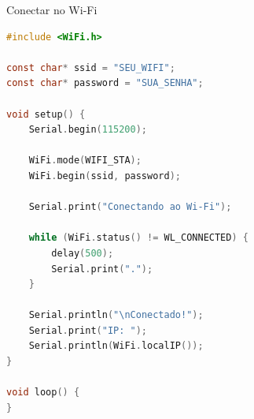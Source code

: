 \begin{frame}[fragile]{Conectar no Wi-Fi}
\begin{lstlisting}[language=C, basicstyle=\tiny\ttfamily]
#include <WiFi.h>

const char* ssid = "SEU_WIFI";
const char* password = "SUA_SENHA";

void setup() {
    Serial.begin(115200);

    WiFi.mode(WIFI_STA);
    WiFi.begin(ssid, password);

    Serial.print("Conectando ao Wi-Fi");

    while (WiFi.status() != WL_CONNECTED) {
        delay(500);
        Serial.print(".");
    }

    Serial.println("\nConectado!");
    Serial.print("IP: ");
    Serial.println(WiFi.localIP());
}
    
void loop() {
}
\end{lstlisting}
\end{frame}

